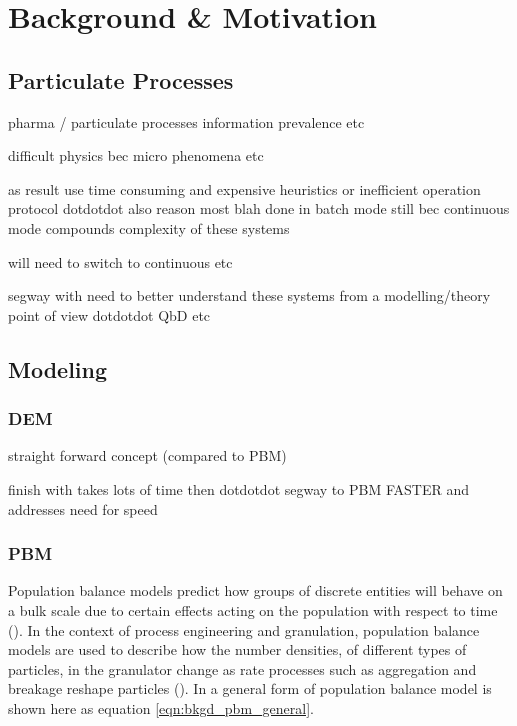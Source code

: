 \documentclass[preprint,11pt,authoryear]{elsarticle}
\begin{document}
	
\section{Background \& Motivation}

  \subsection{Particulate Processes}
  \par pharma / particulate processes information prevalence etc
  \par difficult physics bec micro phenomena etc 
  \par as result use time consuming and expensive heuristics or inefficient operation protocol  dotdotdot also reason most blah done in batch mode still bec continuous mode compounds complexity of these systems 
  \par will need to switch to continuous etc 
  \par segway with need to better understand these systems from a modelling/theory point of view dotdotdot QbD etc 
  
  \subsection{Modeling}
    \subsubsection{DEM}
    \par straight forward concept (compared to PBM) 
    
    \par finish with takes lots of time then dotdotdot segway to PBM FASTER and addresses need for speed
    
    \subsubsection{PBM}
    \par Population balance models predict how groups of discrete entities will behave on a bulk scale due to certain effects acting on the population with respect to time (\cite{ramkrishna2014}). In the context of process engineering and granulation, population balance models are used to describe how the number densities, of different types of particles, in the granulator change as rate processes such as aggregation and breakage reshape particles (\cite{Barrasso2013}). In a general form of population balance model is shown here as equation \ref{eqn:bkgd_pbm_general}.
    
\end{document}
